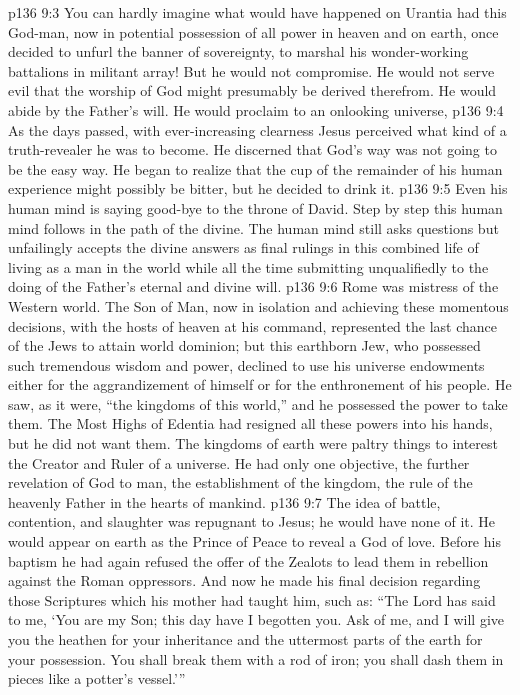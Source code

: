 \vs p136 9:3 You can hardly imagine what would have happened on Urantia had this God\hyp{}man, now in potential possession of all power in heaven and on earth, once decided to unfurl the banner of sovereignty, to marshal his wonder\hyp{}working battalions in militant array! But he would not compromise. He would not serve evil that the worship of God might presumably be derived therefrom. He would abide by the Father’s will. He would proclaim to an onlooking universe, 
\vs p136 9:4 As the days passed, with ever\hyp{}increasing clearness Jesus perceived what kind of a truth\hyp{}revealer he was to become. He discerned that God’s way was not going to be the easy way. He began to realize that the cup of the remainder of his human experience might possibly be bitter, but he decided to drink it.
\vs p136 9:5 Even his human mind is saying good\hyp{}bye to the throne of David. Step by step this human mind follows in the path of the divine. The human mind still asks questions but unfailingly accepts the divine answers as final rulings in this combined life of living as a man in the world while all the time submitting unqualifiedly to the doing of the Father’s eternal and divine will.
\vs p136 9:6 Rome was mistress of the Western world. The Son of Man, now in isolation and achieving these momentous decisions, with the hosts of heaven at his command, represented the last chance of the Jews to attain world dominion; but this earthborn Jew, who possessed such tremendous wisdom and power, declined to use his universe endowments either for the aggrandizement of himself or for the enthronement of his people. He saw, as it were, “the kingdoms of this world,” and he possessed the power to take them. The Most Highs of Edentia had resigned all these powers into his hands, but he did not want them. The kingdoms of earth were paltry things to interest the Creator and Ruler of a universe. He had only one objective, the further revelation of God to man, the establishment of the kingdom, the rule of the heavenly Father in the hearts of mankind.
\vs p136 9:7 The idea of battle, contention, and slaughter was repugnant to Jesus; he would have none of it. He would appear on earth as the Prince of Peace to reveal a God of love. Before his baptism he had again refused the offer of the Zealots to lead them in rebellion against the Roman oppressors. And now he made his final decision regarding those Scriptures which his mother had taught him, such as: “The Lord has said to me, ‘You are my Son; this day have I begotten you. Ask of me, and I will give you the heathen for your inheritance and the uttermost parts of the earth for your possession. You shall break them with a rod of iron; you shall dash them in pieces like a potter’s vessel.’”
